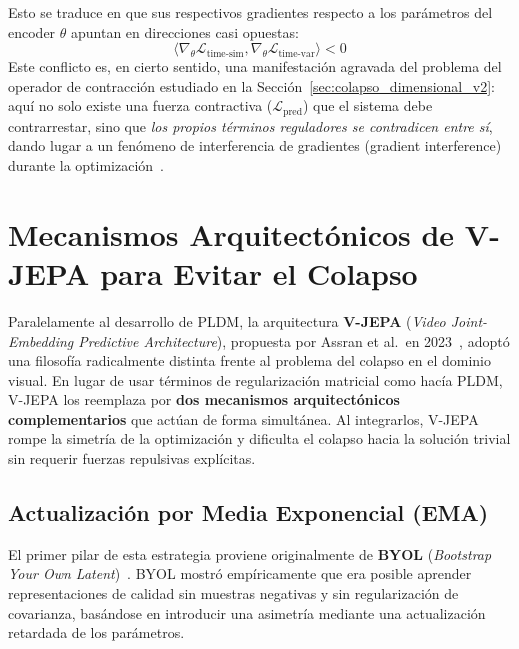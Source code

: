 Esto se traduce en que sus respectivos gradientes respecto a los parámetros del encoder $\theta$ apuntan en direcciones casi opuestas:
\begin{equation}
\langle \nabla_{\theta} \mathcal{L}_{\text{time-sim}}, \nabla_{\theta} \mathcal{L}_{\text{time-var}} \rangle < 0
\end{equation}
Este conflicto es, en cierto sentido, una manifestación agravada del problema del operador de contracción estudiado en la Sección~\ref{sec:colapso_dimensional_v2}: aquí no solo existe una fuerza contractiva ($\mathcal{L}_{\text{pred}}$) que el sistema debe contrarrestar, sino que \emph{los propios términos reguladores se contradicen entre sí}, dando lugar a un fenómeno de interferencia de gradientes (gradient interference) durante la optimización~\cite{yu2020gradient}. 

\section{Mecanismos Arquitectónicos de V-JEPA para Evitar el Colapso}
\label{sec:vjepa_anticolapso}

Paralelamente al desarrollo de PLDM, la arquitectura \textbf{V-JEPA} (\textit{Video Joint-Embedding Predictive Architecture}), propuesta por Assran et al.\ en 2023~\cite{assran2023self}, adoptó una filosofía radicalmente distinta frente al problema del colapso en el dominio visual. En lugar de usar términos de regularización matricial como hacía PLDM, V-JEPA los reemplaza por \textbf{dos mecanismos arquitectónicos complementarios} que actúan de forma simultánea. Al integrarlos, V-JEPA rompe la simetría de la optimización y dificulta el colapso hacia la solución trivial sin requerir fuerzas repulsivas explícitas.

\subsection{Actualización por Media Exponencial (EMA)}
\label{subsec:ema}

El primer pilar de esta estrategia proviene originalmente de \textbf{BYOL} (\textit{Bootstrap Your Own Latent})~\cite{grill2020bootstrap}. BYOL mostró empíricamente que era posible aprender representaciones de calidad sin muestras negativas y sin regularización de covarianza, basándose en introducir una asimetría mediante una actualización retardada de los parámetros.


